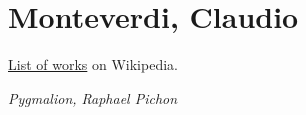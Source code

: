 \chapter{Monteverdi, Claudio} %
\label{cha:monteverdi}

\href{https://en.wikipedia.org/wiki/List_of_compositions_by_Claudio_Monteverdi}{List of works} on Wikipedia.

 \textit{Pygmalion, Raphael Pichon} \\ 
